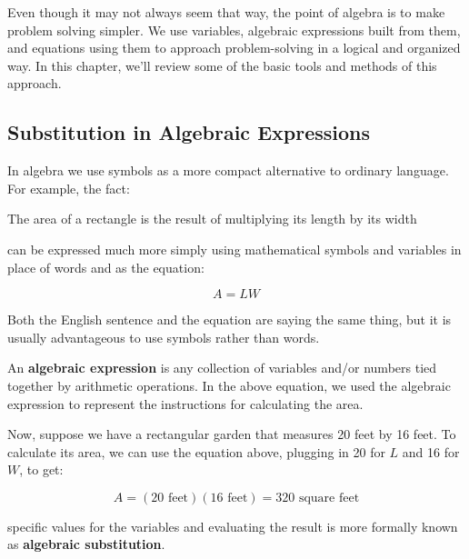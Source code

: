 Even though it may not always seem that way, the point of algebra is to make problem solving simpler. We use variables, algebraic expressions built from them, and equations using them to approach problem-solving in a logical and organized way. In this chapter, we’ll review some of the basic tools and methods of this approach.

%
%

\subsection{Substitution in Algebraic Expressions}

In algebra we use symbols as a more compact alternative to ordinary language. For example, the fact:

\begin{center}
	The area of a rectangle is the result of multiplying its length by its width
\end{center}

can be expressed much more simply using mathematical symbols and variables in place of words and as the equation:

$$A=LW$$

Both the English sentence and the equation are saying the same thing, but it is usually advantageous to use symbols rather than words.

An \textbf{algebraic expression} is any collection of variables and/or numbers tied together by arithmetic operations. In the above equation, we used the algebraic expression  to represent the instructions for calculating the area.

Now, suppose we have a rectangular garden that measures 20 feet by 16 feet. To calculate its area, we can use the equation above, plugging in 20 for $L$ and 16 for $W$, to get:

$$A = (20 \text{ feet})(16 \text{ feet}) = 320 \text{ square feet}$$

 specific values for the variables and evaluating the result is more formally known as  \textbf{algebraic substitution}.


